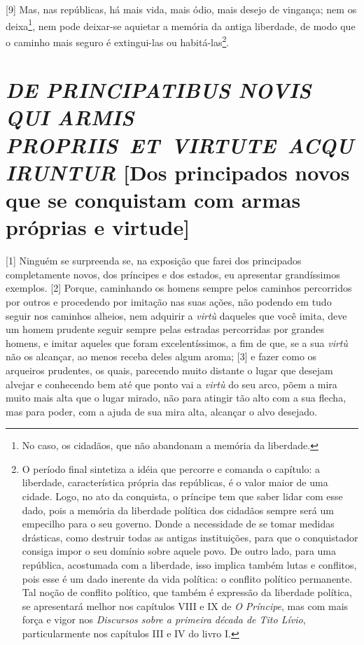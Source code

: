 {[}9{]} Mas, nas repúblicas, há mais vida, mais ódio, mais desejo de
vingança; nem os deixa\footnote{No caso, os cidadãos, que não abandonam
  a memória da liberdade.}, nem pode deixar-se aquietar a memória da
antiga liberdade, de modo que o caminho mais seguro é extingui-las ou
habitá-las\footnote{O período final sintetiza a idéia que percorre e
  comanda o capítulo: a liberdade, característica própria das
  repúblicas, é o valor maior de uma cidade. Logo, no ato da conquista,
  o príncipe tem que saber lidar com esse dado, pois a memória da
  liberdade política dos cidadãos sempre será um empecilho para o seu
  governo. Donde a necessidade de se tomar medidas drásticas, como
  destruir todas as antigas instituições, para que o conquistador
  consiga impor o seu domínio sobre aquele povo. De outro lado, para uma
  república, acostumada com a liberdade, isso implica também lutas e
  conflitos, pois esse é um dado inerente da vida política: o conflito
  político permanente. Tal noção de conflito político, que também é
  expressão da liberdade política, se apresentará melhor nos capítulos
  VIII e IX de \emph{O Príncipe}, mas com mais força e vigor nos
  \emph{Discursos sobre a primeira década de Tito Lívio},
  particularmente nos capítulos III e IV do livro I.}.

\quebra\section{\emph{DE PRINCIPATIBUS NOVIS QUI ARMIS PROPRIIS~ET~VIRTUTE~ACQUIRUNTUR}\break
{[}Dos principados novos que se conquistam com armas próprias e virtude{]}}

{[}1{]} Ninguém se surpreenda se, na exposição que farei dos principados
completamente novos, dos príncipes e dos estados, eu apresentar
grandíssimos exemplos. {[}2{]} Porque, caminhando os homens sempre pelos
caminhos percorridos por outros e procedendo por imitação nas suas
ações, não podendo em tudo seguir nos caminhos alheios, nem adquirir a
\emph{virtù} daqueles que você imita, deve um homem prudente seguir
sempre pelas estradas percorridas por grandes homens, e imitar aqueles
que foram excelentíssimos, a fim de que, se a sua \emph{virtù} não os
alcançar, ao menos receba deles algum aroma; {[}3{]} e fazer como os
arqueiros prudentes, os quais, parecendo muito distante o lugar que
desejam alvejar e conhecendo bem até que ponto vai a \emph{virtù} do seu
arco, põem a mira muito mais alta que o lugar mirado, não para atingir
tão alto com a sua flecha, mas para poder, com a ajuda de sua mira alta,
alcançar o alvo desejado.

